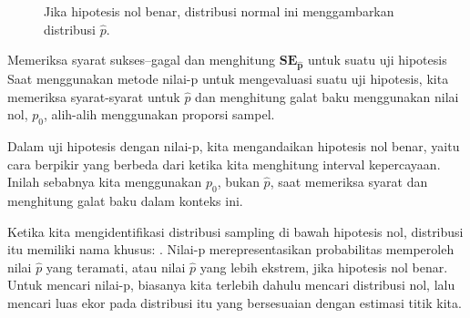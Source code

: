 \begin{figure}[h]
  \centering
  \caption{
      Jika hipotesis nol benar,
      distribusi normal ini menggambarkan
      distribusi $\hat{p}$.}
  \label{normal_dist_mean_500_se_016}
\end{figure}

\begin{onebox}{Memeriksa syarat sukses--gagal dan menghitung
      $\mathbf{SE_{\hat{p}}}$
      untuk suatu uji hipotesis}
  Saat menggunakan metode nilai-p untuk mengevaluasi suatu uji hipotesis,
  kita memeriksa syarat-syarat untuk $\hat{p}$ dan menghitung
  galat baku menggunakan nilai nol, $p_0$, alih-alih menggunakan
  proporsi sampel. \stdvspace{}

  Dalam uji hipotesis dengan nilai-p, kita mengandaikan
  hipotesis nol benar,
  yaitu cara berpikir yang berbeda dari ketika kita menghitung
  interval kepercayaan.
  Inilah sebabnya kita menggunakan $p_0$, bukan $\hat{p}$,
  saat memeriksa syarat dan menghitung galat baku
  dalam konteks ini.
\end{onebox}

Ketika kita mengidentifikasi distribusi sampling di bawah hipotesis nol,
distribusi itu memiliki nama khusus: .
Nilai-p merepresentasikan probabilitas memperoleh nilai $\hat{p}$ yang teramati,
atau nilai $\hat{p}$ yang lebih ekstrem,
jika hipotesis nol benar.
Untuk mencari nilai-p, biasanya kita terlebih dahulu mencari distribusi nol,
lalu mencari luas ekor pada distribusi itu yang bersesuaian
dengan estimasi titik kita.

